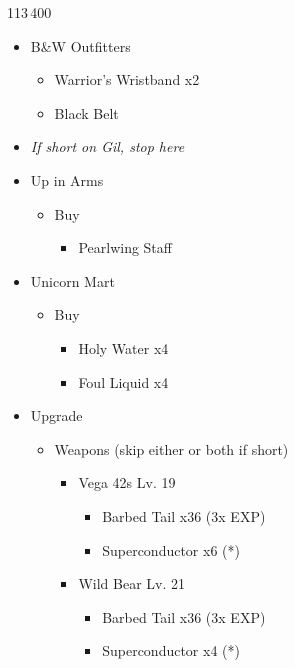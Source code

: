 \begin{paracol}{2}
\begin{shop}{113\,400}
\begin{itemize}
			\item B\&W Outfitters
			      \begin{itemize}
				      \item Warrior's Wristband x2
				      \item Black Belt
			      \end{itemize}
			\item\textit{If short on Gil, stop here}
			\item Up in Arms
			      \begin{itemize}
				      \item Buy
				            \begin{itemize}
					            \item Pearlwing Staff
				            \end{itemize}
			      \end{itemize}
			\item Unicorn Mart
			      \begin{itemize}
				      \item Buy
				            \begin{itemize}
					            \item Holy Water x4
					            \item Foul Liquid x4
				            \end{itemize}
			      \end{itemize}
		\end{itemize}
	\end{shop}
	\switchcolumn*
	\begin{upgrade}

		\begin{itemize}
			\item Upgrade
			      \begin{itemize}
				      \item Weapons (skip either or both if short)
				            \begin{itemize}
					            \item Vega 42s Lv. 19
					                  \begin{itemize}
						                  \item Barbed Tail x36 (3x EXP)
						                  \item Superconductor x6 (*)
					                  \end{itemize}
					            \item Wild Bear Lv. 21
					                  \begin{itemize}
						                  \item Barbed Tail x36 (3x EXP)
						                  \item Superconductor x4 (*)
					                  \end{itemize}
				            \end{itemize}


\end{itemize}
\end{itemize}
\end{upgrade}
\end{paracol}

